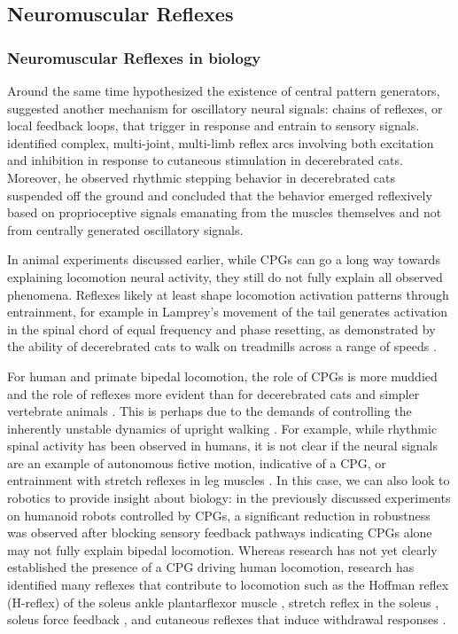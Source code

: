 \subsection{Neuromuscular Reflexes}\label{sec:back_neuromuscular_reflexs}
\subsubsection{Neuromuscular Reflexes in biology}
Around the same time \citeauthor{brown1911intrinsic} hypothesized the existence
of central pattern generators, \citet{sherrington1910integrative,
sherrington1910flexion} suggested another mechanism for oscillatory neural
signals: chains of reflexes, or local feedback loops, that trigger in response
and entrain to sensory signals. \citeauthor{sherrington1910integrative}
identified complex, multi-joint, multi-limb reflex arcs involving both
excitation and inhibition in response to cutaneous stimulation in decerebrated
cats. Moreover, he observed rhythmic stepping behavior in decerebrated cats
suspended off the ground and concluded that the behavior emerged reflexively
based on proprioceptive signals emanating from the muscles themselves and not
from centrally generated oscillatory signals.

In animal experiments discussed earlier, while CPGs can go a long way towards
explaining locomotion neural activity, they still do not fully explain all
observed phenomena. Reflexes likely at least shape locomotion activation
patterns through entrainment, for example in Lamprey's movement of the tail
generates activation in the spinal chord of equal frequency
\citep{mcclellan1993mechanosensory} and phase resetting, as demonstrated by the
ability of decerebrated cats to walk on treadmills across a range of speeds
\citep{rossignol2000locomotion}.

For human and primate bipedal locomotion, the role of CPGs is more muddied and
the role of reflexes more evident than for decerebrated cats and simpler
vertebrate animals \citep{mackay2002central, vaughan2003theories,
nielsen2003we}. This is perhaps due to the demands of controlling the inherently
unstable dynamics of upright walking \citep{capaday2002special}. For example,
while rhythmic spinal activity has been observed in humans, it is not clear if
the neural signals are an example of autonomous fictive motion, indicative of a
CPG, or entrainment with stretch reflexes in leg muscles
\citep{capaday2002special, stewart1991modulation}. In this case, we can also
look to robotics to provide insight about biology: in the previously discussed
experiments on humanoid robots controlled by CPGs, a significant reduction in
robustness was observed after blocking sensory feedback pathways
\citep{endo2005experimental, righetti2006programmable} indicating CPGs alone may
not fully explain bipedal locomotion. Whereas research has not yet clearly
established the presence of a CPG driving human locomotion, research has
identified many reflexes that contribute to locomotion such as the Hoffman
reflex (H-reflex) of the soleus ankle plantarflexor muscle
\citep{capaday1987difference}, stretch reflex in the soleus
\citep{yang1991contribution}, soleus force feedback \citep{grey2007positive},
and cutaneous reflexes that induce withdrawal responses \citep{yang1990phase}. 

